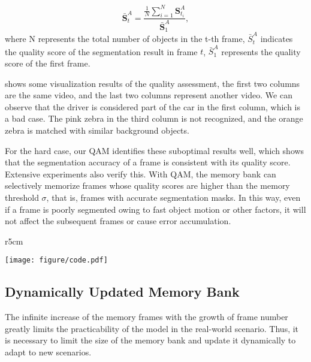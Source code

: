 \documentclass[runningheads]{llncs}
\begin{document}
    \begin{equation}
        \mathbf{\bar{S}}_t^A = \frac{\frac{1}{N}\sum^N_{i=1}\mathbf{S}_{t_i}^A}{\mathbf{\bar{S}}_1^A},
    \end{equation}
    where N represents the total number of objects in the t-th frame, $\bar{S}_t^A$ indicates the quality score of the segmentation result in frame $t$, $\bar{S}_1^A$ represents the quality score of the first frame.

     shows some visualization results of the quality assessment, the first two columns are the same video, and the last two columns represent another video. 
    We can observe that the driver is considered part of the car in the first column, which is a bad case.
    The pink zebra in the third column is not recognized, and the orange zebra is matched with similar background objects. 

    For the hard case,
    our QAM identifies these suboptimal results well, which shows that the segmentation accuracy of a frame is consistent with its quality score. 
    Extensive experiments also verify this.
    With QAM, the memory bank can selectively memorize frames whose quality scores are higher than the memory threshold $\sigma$, that is, frames with accurate segmentation masks.
    In this way, even if a frame is poorly segmented owing to
    fast object motion or other factors, 
    it will not affect the subsequent frames or cause error accumulation. 
    
    	\begin{wrapfigure}{r}{5cm}
		\begin{minipage}[p]{1\linewidth}
            \centering
			\texttt{[image: figure/code.pdf]}
			\label{memory cap}
		\end{minipage}
	\end{wrapfigure}      
    \subsection{Dynamically Updated Memory Bank}
     
The infinite increase of the memory frames with the growth of frame number greatly limits the practicability of the model in the real-world scenario.
    Thus, it is necessary to limit the size of the memory bank and update it dynamically to adapt to new scenarios.
    
\end{document}
